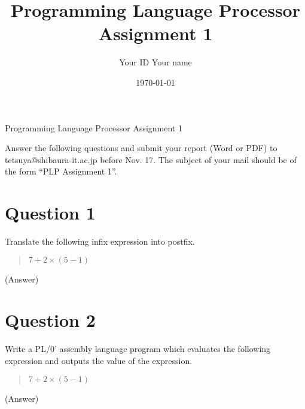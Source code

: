 \documentclass{article}
\title{Programming Language Processor \\ Assignment 1}
\author{Your ID   Your name}
\date{\today}
\begin{document}
\ifreport
\maketitle
\else
\begin{center}
{\huge Programming Language Processor Assignment 1}
\end{center}
Answer the following questions and submit your report (Word or PDF) to
tetsuya@shibaura-it.ac.jp before Nov. 17. 
The subject of your mail should be of the form ``PLP Assignment 1''.
\fi


\section*{Question 1}
Translate the following infix expression into postfix.
\begin{quote}
 $7 + 2 \times (5 - 1)$
\end{quote}

\ifreport
(Answer)\\
\fi




\section*{Question 2}
Write a PL/0' assembly language program which evaluates the following
expression and outputs the value of the expression.
\begin{quote}
 $7 + 2 \times (5 - 1)$
\end{quote}

\ifreport
(Answer)\\
\fi





\end{document}
